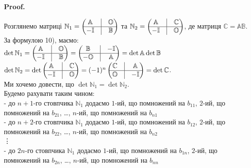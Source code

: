 \documentclass[a4paper, 10pt]{article}
\makeatletter
\theoremstyle{theoremdd}
\renewenvironment{proof}[1][Proof.\\]{\par
\pushQED{\hfill \qed}%
\normalfont \topsep6\p@\@plus6\p@\relax
\trivlist
\item\relax
{\bfseries
#1\@addpunct{.}}\hspace\labelsep\ignorespaces
}{%
\popQED\endtrivlist\@endpefalse
}
\makeatother
\begin{document}
\begin{proof}
Розглянемо матриці $\mathbb{N}_1 = \begin{pmatrix}
 \mathbb{A} & \vline & \mathbb{O} \\
 \hline
 -\mathbb{I} & \vline & \mathbb{B}
\end{pmatrix}$ та $\mathbb{N}_2 = \begin{pmatrix}
 \mathbb{A} & \vline & \mathbb{C} \\
 \hline
 -\mathbb{I} & \vline & \mathbb{O}
\end{pmatrix}$, де матриця $\mathbb{C} = \mathbb{A} \mathbb{B}$. За формулою 10), маємо:\\
$\det \mathbb{N}_1 = \begin{pmatrix}
 \mathbb{A} & \vline & \mathbb{O} \\
 \hline
 -\mathbb{I} & \vline & \mathbb{B}
\end{pmatrix} = \begin{pmatrix}
 \mathbb{B} & \vline & -\mathbb{I} \\
 \hline
 -\mathbb{O} & \vline & \mathbb{A}
\end{pmatrix} = \det \mathbb{A} \det \mathbb{B}$ \\ $\det \mathbb{N}_2 = \det \begin{pmatrix}
 \mathbb{A} & \vline & \mathbb{C} \\
 \hline
 -\mathbb{I} & \vline & \mathbb{O}
\end{pmatrix} = (-1)^n \begin{pmatrix}
 \mathbb{C} & \vline & \mathbb{A} \\
 \hline
 \mathbb{O} & \vline & -\mathbb{I}
\end{pmatrix} = \det \mathbb{C}$.\\
Ми хочемо довести, що $\det \mathbb{N}_1 = \det \mathbb{N}_2$.\\
Будемо рахувати таким чином:\\
- до $n+1$-го стовпчика $\mathbb{N}_1$ додаємо $1$-ий, що помножений на $b_{11}$, $2$-ий, що помножений на $b_{21}$, \dots , $n$-ий, що помножений на $b_{n1}$\\
- до $n+2$-го стовпчика $\mathbb{N}_1$ додаємо $1$-ий, що помножений на $b_{12}$, $2$-ий, що помножений на $b_{22}$, \dots , $n$-ий, що помножений на $b_{n2}$\\
\vdots \\
- до $2n$-го стовпчика $\mathbb{N}_1$ додаємо $1$-ий, що помножений на $b_{1n}$, $2$-ий, що помножений на $b_{2n}$, \dots , $n$-ий, що помножений на $b_{nn}$\\

\end{proof}
\end{document}
